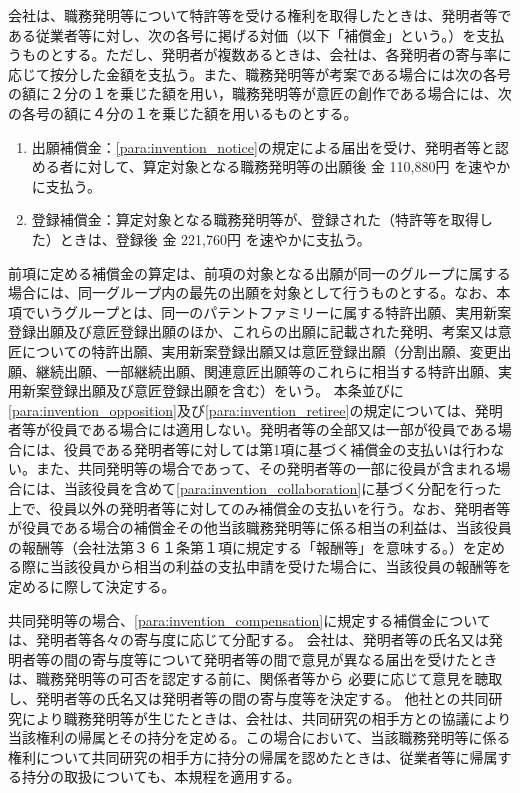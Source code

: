 \documentclass[10pt,a4paper,uplatex]{jsarticle}
\begin{document}
会社は、職務発明等について特許等を受ける権利を取得したときは、発明者等である従業者等に対し、次の各号に掲げる対価（以下「補償金」という。）を支払うものとする。ただし、発明者が複数あるときは、会社は、各発明者の寄与率に応じて按分した金額を支払う。また、職務発明等が考案である場合には次の各号の額に２分の１を乗じた額を用い，職務発明等が意匠の創作である場合には、次の各号の額に４分の１を乗じた額を用いるものとする。
\begin{enumerate}
    \item 出願補償金：\ref{para:invention_notice}の規定による届出を受け、発明者等と認める者に対して、算定対象となる職務発明等の出願後 金 110,880円 を速やかに支払う。
    \item 登録補償金：算定対象となる職務発明等が、登録された（特許等を取得した）ときは、登録後 金 221,760円 を速やかに支払う。
\end{enumerate}
\label{para:invention_compensation}
\term 前項に定める補償金の算定は、前項の対象となる出願が同一のグループに属する場合には、同一グループ内の最先の出願を対象として行うものとする。なお、本項でいうグループとは、同一のパテントファミリーに属する特許出願、実用新案登録出願及び意匠登録出願のほか、これらの出願に記載された発明、考案又は意匠についての特許出願、実用新案登録出願又は意匠登録出願（分割出願、変更出願、継続出願、一部継続出願、関連意匠出願等のこれらに相当する特許出願、実用新案登録出願及び意匠登録出願を含む）をいう。
\term 本条並びに\ref{para:invention_opposition}及び\ref{para:invention_retiree}の規定については、発明者等が役員である場合には適用しない。発明者等の全部又は一部が役員である場合には、役員である発明者等に対しては第1項に基づく補償金の支払いは行わない。また、共同発明等の場合であって、その発明者等の一部に役員が含まれる場合には、当該役員を含めて\ref{para:invention_collaboration}に基づく分配を行った上で、役員以外の発明者等に対してのみ補償金の支払いを行う。なお、発明者等が役員である場合の補償金その他当該職務発明等に係る相当の利益は、当該役員の報酬等（会社法第３６１条第１項に規定する「報酬等」を意味する。）を定める際に当該役員から相当の利益の支払申請を受けた場合に、当該役員の報酬等を定めるに際して決定する。

共同発明等の場合、\ref{para:invention_compensation}に規定する補償金については、発明者等各々の寄与度に応じて分配する。
\label{para:invention_collaboration}
\term 会社は、発明者等の氏名又は発明者等の間の寄与度等について発明者等の間で意見が異なる届出を受けたときは、職務発明等の可否を認定する前に、関係者等から 必要に応じて意見を聴取し、発明者等の氏名又は発明者等の間の寄与度等を決定する。
\term 他社との共同研究により職務発明等が生じたときは、会社は、共同研究の相手方との協議により当該権利の帰属とその持分を定める。この場合において、当該職務発明等に係る権利について共同研究の相手方に持分の帰属を認めたときは、従業者等に帰属する持分の取扱についても、本規程を適用する。
\end{document}
